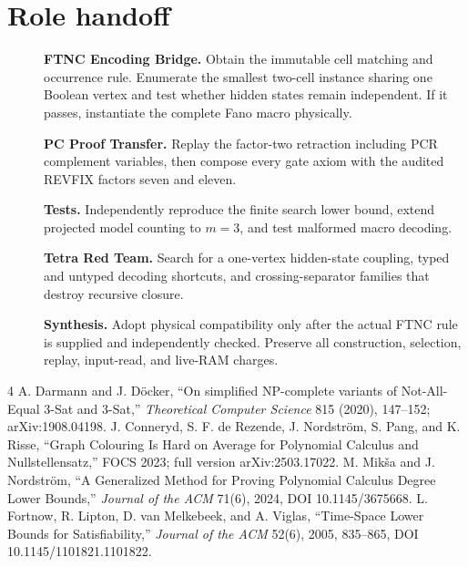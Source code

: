 \documentclass[11pt]{article}
\begin{document}
\section{Role handoff}
\begin{description}
\item[] \textbf{FTNC Encoding Bridge.} Obtain the immutable cell matching and
occurrence rule.  Enumerate the smallest two-cell instance sharing one Boolean
vertex and test whether hidden states remain independent.  If it passes,
instantiate the complete Fano macro physically.
\item[] \textbf{PC Proof Transfer.} Replay the factor-two retraction including
PCR complement variables, then compose every gate axiom with the audited
REVFIX factors seven and eleven.
\item[] \textbf{Tests.} Independently reproduce the finite search lower bound,
extend projected model counting to $m=3$, and test malformed macro decoding.
\item[] \textbf{Tetra Red Team.} Search for a one-vertex hidden-state coupling,
typed and untyped decoding shortcuts, and crossing-separator families that
destroy recursive closure.
\item[] \textbf{Synthesis.} Adopt physical compatibility only after the actual
FTNC rule is supplied and independently checked.  Preserve all construction,
selection, replay, input-read, and live-RAM charges.
\end{description}

\begin{thebibliography}{4}
 A. Darmann and J. D\"ocker,
``On simplified NP-complete variants of Not-All-Equal 3-Sat and 3-Sat,''
\emph{Theoretical Computer Science} 815 (2020), 147--152;
arXiv:1908.04198.
 J. Conneryd, S. F. de Rezende, J. Nordstr\"om, S. Pang,
and K. Risse, ``Graph Colouring Is Hard on Average for Polynomial Calculus
and Nullstellensatz,'' FOCS 2023; full version arXiv:2503.17022.
 M. Mik\v{s}a and J. Nordstr\"om,
``A Generalized Method for Proving Polynomial Calculus Degree Lower Bounds,''
\emph{Journal of the ACM} 71(6), 2024, DOI 10.1145/3675668.
 L. Fortnow, R. Lipton, D. van Melkebeek, and A. Viglas,
``Time-Space Lower Bounds for Satisfiability,'' \emph{Journal of the ACM}
52(6), 2005, 835--865, DOI 10.1145/1101821.1101822.
\end{thebibliography}
\end{document}
